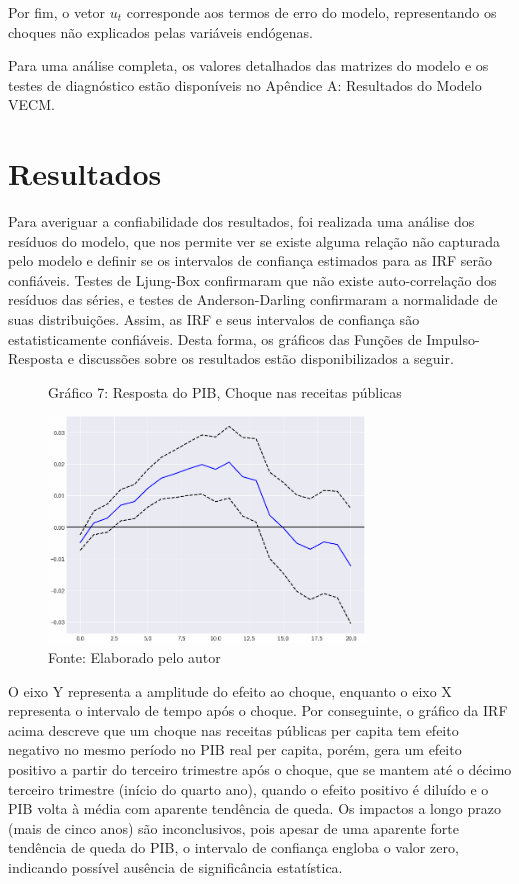 \documentclass[a4paper, 12pt, openany, oneside, brazil]{abntex2}
\begin{document}
Por fim, o vetor $u_t$ corresponde aos termos de erro do modelo, representando os choques não explicados pelas variáveis endógenas.

Para uma análise completa, os valores detalhados das matrizes do modelo e os testes de diagnóstico estão disponíveis no Apêndice A: Resultados do Modelo VECM.




\chapter{Resultados}
Para averiguar a confiabilidade dos resultados, foi realizada uma análise dos resíduos do modelo, que nos permite ver se existe alguma relação não capturada pelo modelo e definir se os intervalos de confiança estimados para as IRF serão confiáveis. Testes de Ljung-Box confirmaram que não existe auto-correlação dos resíduos das séries, e testes de Anderson-Darling confirmaram a normalidade de suas distribuições. Assim, as IRF e seus intervalos de confiança são estatisticamente confiáveis. Desta forma, os gráficos das Funções de Impulso-Resposta e discussões sobre os resultados estão disponibilizados a seguir.


\begin{figure}[h!]
	\caption*{Gráfico 7: Resposta do PIB, Choque nas receitas públicas}
	\includegraphics[width=0.75\textwidth]{resultados/irf_revenue_gdp}
	\caption*{Fonte: Elaborado pelo autor}
\end{figure}

O eixo Y representa a amplitude do efeito ao choque, enquanto o eixo X representa o intervalo de tempo após o choque. Por conseguinte, o gráfico da IRF acima descreve que um choque nas receitas públicas per capita tem efeito negativo no mesmo período no PIB real per capita, porém, gera um efeito positivo a partir do terceiro trimestre após o choque, que se mantem até o décimo terceiro trimestre (início do quarto ano), quando o efeito positivo é diluído e o PIB volta à média com aparente tendência de queda. Os impactos a longo prazo (mais de cinco anos) são inconclusivos, pois apesar de uma aparente forte tendência de queda do PIB, o intervalo de confiança engloba o valor zero, indicando possível ausência de significância estatística.
\end{document}
